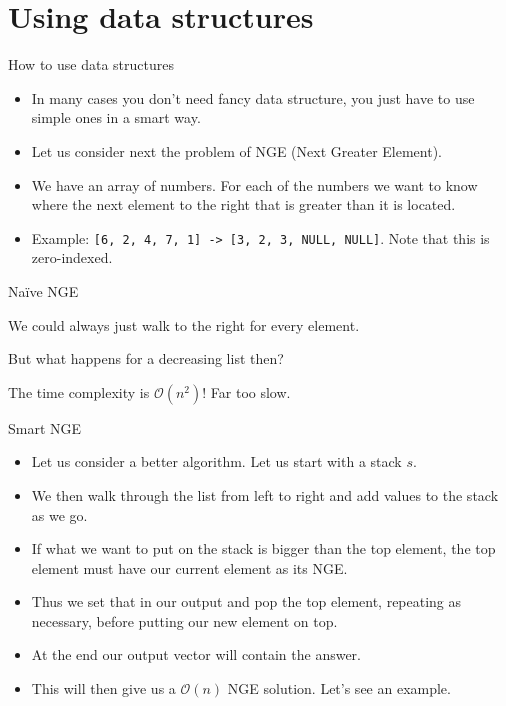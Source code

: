 \documentclass{beamer}
\begin{document}
\section*{Using data structures}

\begin{frame}[plain]{How to use data structures}
    \begin{itemize}
        \item In many cases you don't need fancy data structure, you just have to use simple ones in a smart way.
        \item Let us consider next the problem of NGE (Next Greater Element).
        \item We have an array of numbers. For each of the numbers we want to know where the next element to the right that is greater than it is located.
        \item Example: \texttt{[6, 2, 4, 7, 1] -> [3, 2, 3, NULL, NULL]}. Note that this is zero-indexed.
    \end{itemize}
\end{frame}

\begin{frame}[plain]{Naïve NGE}
    \begin{itemize}
        \item We could always just walk to the right for every element. 
         { \item But what happens for a decreasing list then? }
         { \item The time complexity is $\mathcal{O}(n^2)$! Far too slow. }
    \end{itemize}
\end{frame}

\begin{frame}[plain]{Smart NGE}
    \begin{itemize}
        \item Let us consider a better algorithm. Let us start with a stack $s$.
        \item We then walk through the list from left to right and add values to the stack as we go.
        \item If what we want to put on the stack is bigger than the top element, the top element must have our current element as its NGE.
        \item Thus we set that in our output and pop the top element, repeating as necessary, before putting our new element on top.
        \item At the end our output vector will contain the answer.
        \item This will then give us a $\mathcal{O}(n)$ NGE solution. Let's see an example.
    \end{itemize}
\end{frame}
\end{document}
